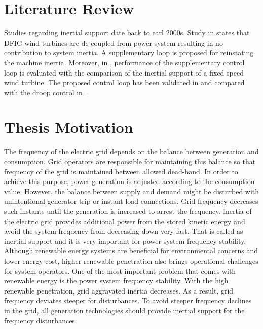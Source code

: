 \section{Literature Review}
Studies regarding inertial support date back to earl 2000s. Study in \cite{Ekanayake2003} states that DFIG wind turbines are de-coupled from power system resulting in no contribution to system inertia. A supplementary loop is proposed for reinstating the machine inertia. Moreover, in \cite{Ekanayake2004}, performance of the  supplementary control loop is evaluated with the comparison of the inertial support of a fixed-speed wind turbine. The proposed control loop has been validated in \cite{Morren2006} and compared with the droop control in \cite{Morren2006a}.



\section{Thesis Motivation}
The frequency of the electric grid depends on the balance between generation and consumption. Grid operators are responsible for maintaining this balance so that frequency of the grid is maintained between allowed dead-band. In order to achieve this purpose, power generation is adjusted according to the consumption value. However, the balance between supply and demand might be disturbed with unintentional generator trip or instant load connections. Grid frequency decreases such instants until the generation is increased to arrest the frequency. Inertia of the electric grid provides additional power from the stored kinetic energy and avoid the system frequency from decreasing down very fast. That is called as inertial support and it is very important for power system frequency stability.\\

Although renewable energy systems are beneficial for environmental concerns and lower energy cost, higher renewable penetration also brings operational challenges for system operators. One of the most important problem that comes with renewable energy is the power system frequency stability. With the high renewable penetration, grid aggravated inertia decreases. As a result, grid frequency deviates steeper for disturbances. To avoid steeper frequency declines in the grid, all generation technologies should provide inertial support for the frequency disturbances.



















